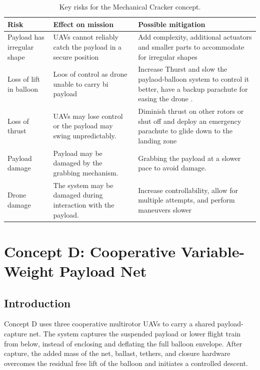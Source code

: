 \begin{table}[H]
\centering
\small
\caption{Key risks for the Mechanical Cracker concept.}
\label{tab:conceptD_key_risks}
\begin{tabularx}{\textwidth}{p{} X p{}}
\toprule
\textbf{Risk} & \textbf{Effect on mission} & \textbf{Possible mitigation} \\
\midrule
Payload has irregular shape  & UAVs cannot reliably catch the payload in a secure position & Add complexity, additional actuators and smaller parts to accommodate for irregular shapes\\
Loss of lift in  balloon & Loos of control as drone unable to carry bi payload  & Increase Thurst and slow the paylaod-balloon system to control it better, have a backup parachute for easing the drone . \\
Loss of thrust  & UAVs may lose control or the payload may swing unpredictably. & Diminish  thrust on other rotors or shut off and deploy an emergency parachute to glide down to the landing zone \\
Payload damage & Payload may be damaged by the grabbing mechanism. & Grabbing the payload at a slower pace to avoid damage. \\
Drone damage & The system may be damaged during interaction with the payload. & Increase controllability, allow for multiple attempts, and perform maneuvers slower \\

\bottomrule
\end{tabularx}
\end{table}




\section{Concept D: Cooperative Variable-Weight Payload Net}




\subsection{Introduction}

Concept D uses three cooperative multirotor UAVs to carry a shared payload-capture net. The system captures the suspended payload or lower flight train from below, instead of enclosing and deflating the full balloon envelope. After capture, the added mass of the net, ballast, tethers, and closure hardware overcomes the residual free lift of the balloon and initiates a controlled descent.

